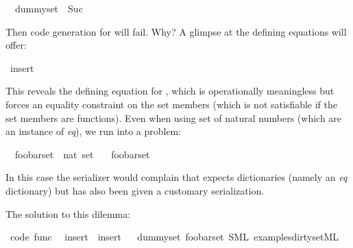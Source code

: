 \begin{isabellebody}
\ \ {\isachardoublequoteopen}dummy{\isacharunderscore}set\ {\isacharequal}\ {\isacharbraceleft}Suc{\isacharbraceright}{\isachardoublequoteclose}%
\begin{isamarkuptext}%
Then code generation for  will fail.
  Why? A glimpse at the defining equations will offer:%
\end{isamarkuptext}%
\isamarkuptrue%
\isamarkupfalse%
\ {\isacharparenleft}insert{\isacharparenright}%
\begin{isamarkuptext}%
This reveals the defining equation 
  for , which is operationally meaningless
  but forces an equality constraint on the set members
  (which is not satisfiable if the set members are functions).
  Even when using set of natural numbers (which are an instance
  of \emph{eq}), we run into a problem:%
\end{isamarkuptext}%
\isamarkuptrue%
\isamarkupfalse%
\isanewline
\ \ foobar{\isacharunderscore}set\ {\isacharcolon}{\isacharcolon}\ {\isachardoublequoteopen}nat\ set{\isachardoublequoteclose}\ \isanewline
\ \ {\isachardoublequoteopen}foobar{\isacharunderscore}set\ {\isacharequal}\ {\isacharbraceleft}{}{\isacharcomma}\ {}{\isacharcomma}\ {}{\isacharbraceright}{\isachardoublequoteclose}%
\begin{isamarkuptext}%
In this case the serializer would complain that 
  expects dictionaries (namely an \emph{eq} dictionary) but
  has also been given a customary serialization.

  The solution to this dilemma:%
\end{isamarkuptext}%
\isamarkuptrue%
\isamarkupfalse%
\ {\isacharbrackleft}code\ func{\isacharbrackright}{\isacharcolon}\isanewline
\ \ {\isachardoublequoteopen}insert\ {\isacharequal}\ insert{\isachardoublequoteclose}%
\isadelimproof
\ %
\endisadelimproof
%
\isatagproof
\isacommand{{\isachardot}{\isachardot}}\isamarkupfalse%
%
\endisatagproof
{\isafoldproof}%
%
\isadelimproof
%
\endisadelimproof
\isanewline
\isanewline
{}\isamarkupfalse%
\ dummy{\isacharunderscore}set\ foobar{\isacharunderscore}set\ {\isacharparenleft}SML\ {\isachardoublequoteopen}examples{\isacharslash}dirty{\isacharunderscore}set{\isachardot}ML{\isachardoublequoteclose}{\isacharparenright}%
\begin{isamarkuptext}%


\end{isamarkuptext}
\end{isabellebody}
